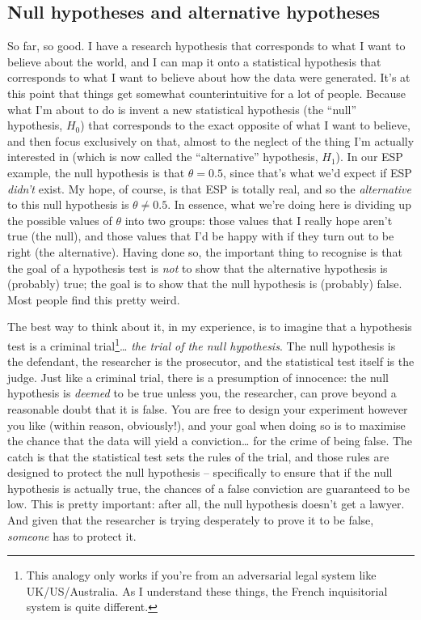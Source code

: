 \documentclass[
]{book}
\begin{document}
\hypertarget{null-hypotheses-and-alternative-hypotheses}{%
\subsection{Null hypotheses and alternative hypotheses}\label{null-hypotheses-and-alternative-hypotheses}}

So far, so good. I have a research hypothesis that corresponds to what I want to believe about the world, and I can map it onto a statistical hypothesis that corresponds to what I want to believe about how the data were generated. It's at this point that things get somewhat counterintuitive for a lot of people. Because what I'm about to do is invent a new statistical hypothesis (the ``null'' hypothesis, \(H_0\)) that corresponds to the exact opposite of what I want to believe, and then focus exclusively on that, almost to the neglect of the thing I'm actually interested in (which is now called the ``alternative'' hypothesis, \(H_1\)). In our ESP example, the null hypothesis is that \(\theta = 0.5\), since that's what we'd expect if ESP \emph{didn't} exist. My hope, of course, is that ESP is totally real, and so the \emph{alternative} to this null hypothesis is \(\theta \neq 0.5\). In essence, what we're doing here is dividing up the possible values of \(\theta\) into two groups: those values that I really hope aren't true (the null), and those values that I'd be happy with if they turn out to be right (the alternative). Having done so, the important thing to recognise is that the goal of a hypothesis test is \emph{not} to show that the alternative hypothesis is (probably) true; the goal is to show that the null hypothesis is (probably) false. Most people find this pretty weird.

The best way to think about it, in my experience, is to imagine that a hypothesis test is a criminal trial\footnote{This analogy only works if you're from an adversarial legal system like UK/US/Australia. As I understand these things, the French inquisitorial system is quite different.}\ldots{} \emph{the trial of the null hypothesis}. The null hypothesis is the defendant, the researcher is the prosecutor, and the statistical test itself is the judge. Just like a criminal trial, there is a presumption of innocence: the null hypothesis is \emph{deemed} to be true unless you, the researcher, can prove beyond a reasonable doubt that it is false. You are free to design your experiment however you like (within reason, obviously!), and your goal when doing so is to maximise the chance that the data will yield a conviction\ldots{} for the crime of being false. The catch is that the statistical test sets the rules of the trial, and those rules are designed to protect the null hypothesis -- specifically to ensure that if the null hypothesis is actually true, the chances of a false conviction are guaranteed to be low. This is pretty important: after all, the null hypothesis doesn't get a lawyer. And given that the researcher is trying desperately to prove it to be false, \emph{someone} has to protect it.
\end{document}
